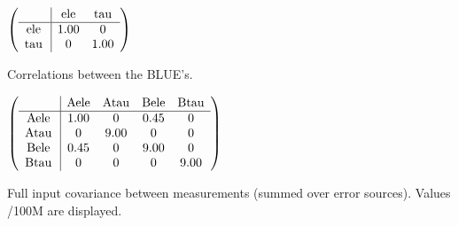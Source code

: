 \begin{table}[H]
\scriptsize
\begin{center}
\renewcommand{\arraystretch}{1.1}
\begin{math}\left(\begin{array}{c|cc}
 & \mathrm{ele} & 
\mathrm{tau} \\
\hline
\mathrm{ele} \hspace*{2pt} &       1.00 &  0 \\
\mathrm{tau} \hspace*{2pt} &  0 &       1.00 \\
\end{array}\right)\end{math}
\caption{Correlations between the BLUE's.}
\renewcommand{\arraystretch}{1}
\end{center}
\end{table}
\begin{table}[H]
\scriptsize
\begin{center}
\renewcommand{\arraystretch}{1.1}
\begin{math}\left(\begin{array}{c|cccc}
 & \mathrm{Aele} & 
\mathrm{Atau} & 
\mathrm{Bele} & 
\mathrm{Btau} \\
\hline
\mathrm{Aele} \hspace*{2pt} &       1.00 &  0 &       0.45 &  0 \\
\mathrm{Atau} \hspace*{2pt} &  0 &       9.00 &  0 &  0 \\
\mathrm{Bele} \hspace*{2pt} &       0.45 &  0 &       9.00 &  0 \\
\mathrm{Btau} \hspace*{2pt} &  0 &  0 &  0 &       9.00 \\
\end{array}\right)\end{math}
\caption{Full input covariance between measurements (summed over error sources). Values /100M are displayed.}
\renewcommand{\arraystretch}{1}
\end{center}
\end{table}
